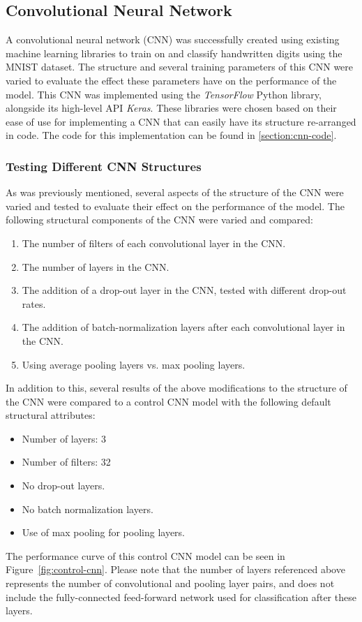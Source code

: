 \documentclass[a4paper]{article}
\begin{document}
\newpage

\subsection{Convolutional Neural Network}\label{cnn_lib}
A convolutional neural network (CNN) was successfully created using existing machine learning libraries to train on and classify handwritten digits using the MNIST dataset. The structure and several training parameters of this CNN were varied to evaluate the effect these parameters have on the performance of the model. This CNN was implemented using the \textit{TensorFlow} Python library, alongside its high-level API \textit{Keras}. These libraries were chosen based on their ease of use for implementing a CNN that can easily have its structure re-arranged in code. The code for this implementation can be found in \ref{section:cnn-code}.

\subsubsection{Testing Different CNN Structures}

As was previously mentioned, several aspects of the structure of the CNN were varied and tested to evaluate their effect on the performance of the model. The following structural components of the CNN were varied and compared:
\begin{enumerate}
    \item The number of filters of each convolutional layer in the CNN.
    \item The number of layers in the CNN.
    \item The addition of a drop-out layer in the CNN, tested with different drop-out rates.
    \item The addition of batch-normalization layers after each convolutional layer in the CNN.
    \item Using average pooling layers vs. max pooling layers. 
\end{enumerate}
In addition to this, several results of the above modifications to the structure of the CNN were compared to a control CNN model with the following default structural attributes:
\newpage
\begin{itemize}
    \item Number of layers: 3
    \item Number of filters: 32
    \item No drop-out layers.
    \item No batch normalization layers.
    \item Use of max pooling for pooling layers.
\end{itemize}
The performance curve of this control CNN model can be seen in Figure~\ref{fig:control-cnn}. Please note that the number of layers referenced above represents the number of convolutional and pooling layer pairs, and does not include the fully-connected feed-forward network used for classification after these layers.
\end{document}
